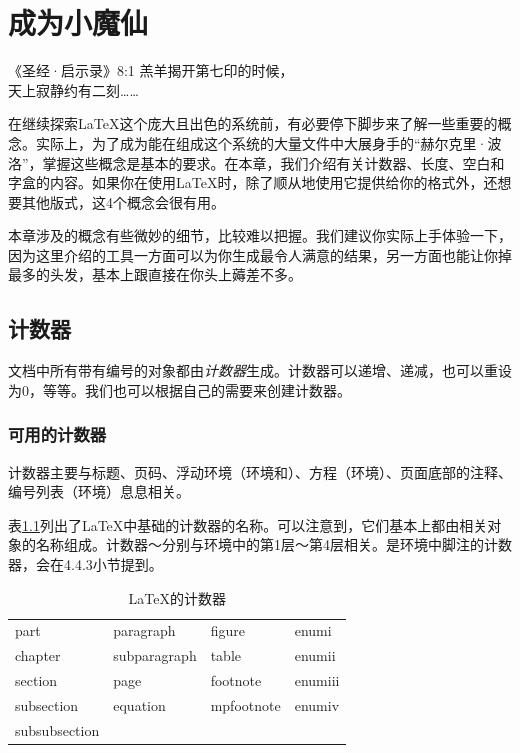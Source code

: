 \chapter{成为小魔仙}

\begin{epigraphe}{《圣经·启示录》8:1}
    羔羊揭开第七印的时候，\\天上寂静约有二刻……
\end{epigraphe}

在继续探索\LaTeX 这个庞大且出色的系统前，有必要停下脚步来了解一些重要的概念。实际上，为了成为能在组成这个系统的大量文件中大展身手的``赫尔克里·波洛''，掌握这些概念是基本的要求。在本章，我们介绍有关计数器、长度、空白和字盒的内容。如果你在使用\LaTeX 时，除了顺从地使用它提供给你的格式外，还想要其他版式，这4个概念会很有用。

\begin{exclamation}
    本章涉及的概念有些微妙的细节，比较难以把握。我们建议你实际上手体验一下，因为这里介绍的工具一方面可以为你生成最令人满意的结果，另一方面也能让你掉最多的头发，基本上跟直接在你头上薅差不多。
\end{exclamation}
\section{计数器}

文档中所有带有编号的对象都由\emph{计数器}生成。计数器可以递增、递减，也可以重设为0，等等。我们也可以根据自己的需要来创建计数器。

\subsection{可用的计数器}

计数器主要与标题、页码、浮动环境（环境和）、方程（环境）、页面底部的注释、编号列表（环境）息息相关。

表\ref{tab:4.1}列出了\LaTeX 中基础的计数器的名称。可以注意到，它们基本上都由相关对象的名称组成。计数器～分别与环境中的第1层～第4层相关。是环境中脚注的计数器，会在4.4.3小节提到。

\begin{table}
  \centering
  \ttfamily
  \begin{tabular}{|l|l|l|l|}
    \hline
    part       & paragraph    & figure     & enumi\\
    chapter    & subparagraph & table      & enumii\\
    section    & page         & footnote   & enumiii\\
    subsection & equation     & mpfootnote & enumiv\\
    subsubsection &&&\\
    \hline
  \end{tabular}
  \caption{\LaTeX 的计数器}
  \label{tab:4.1}
\end{table}

